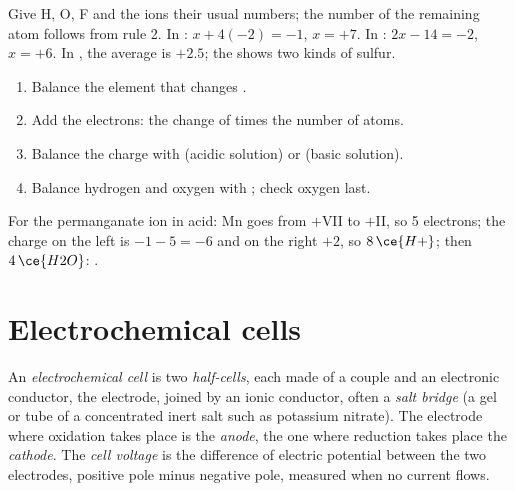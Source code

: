 \begin{method}\label{met:b1:nernst:oxidation-numbers}
Give H, O, F and the ions their usual numbers; the number of the remaining
atom follows from rule 2. In : $x + 4(-2) = -1$, $x = +7$. In
: $2x - 14 = -2$, $x = +6$. In , the average is
$+2.5$; the  shows two kinds of sulfur.
\end{method}

\begin{method}\label{met:b1:nernst:balance-by-on}
\begin{enumerate}
  \item Balance the element that changes .
  \item Add the electrons: the change of  times the
        number of atoms.
  \item Balance the charge with  (acidic solution) or 
        (basic solution).
  \item Balance hydrogen and oxygen with ; check oxygen last.
\end{enumerate}
For the permanganate ion in acid: Mn goes from $+$VII to $+$II, so 5
electrons; the charge on the left is $-1 - 5 = -6$ and on the right $+2$,
so $8\,\ce{H+}$; then $4\,\ce{H2O}$:
.
\end{method}

\section{Electrochemical cells}

\begin{definition}\label{def:b1:nernst:cell}
An \emph{electrochemical cell} is two
\emph{half-cells}, each made of a couple and an
electronic conductor, the electrode, joined by an ionic conductor, often a
\emph{salt bridge} (a gel or tube of a concentrated
inert salt such as potassium nitrate). The electrode where oxidation
takes place is the \emph{anode}, the one where reduction
takes place the \emph{cathode}. The \emph{cell
voltage} is the difference of electric potential
between the two electrodes, positive pole minus negative pole, measured
when no current flows.
\end{definition}

